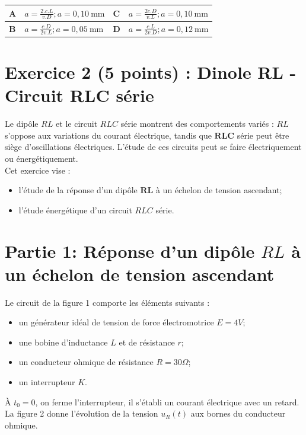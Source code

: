\begin{center}
\begin{tabular}{|l|l|l|l|}
\hline
$\mathbf{A}$ & $a=\frac{2 . c . L}{v . D} ; a=0,10 \mathrm{~mm}$ & $\mathbf{C}$ & $a=\frac{2 c . D}{v . L} ; a=0,10 \mathrm{~mm}$ \\
\hline
$\mathbf{B}$ & $a=\frac{c . D}{2 v . L} ; a=0,05 \mathrm{~mm}$ & $\mathbf{D}$ & $a=\frac{c . L}{2 v . D} ; a=0,12 \mathrm{~mm}$ \\
\hline
\end{tabular}
\end{center}

\section*{Exercice 2 (5 points) : Dinole RL - Circuit RLC série}
Le dipôle $R L$ et le circuit $R L C$ série montrent des comportements variés : $R L$ s'oppose aux variations du courant électrique, tandis que $\boldsymbol{R} \boldsymbol{L} \boldsymbol{C}$ série peut être siège d'oscillations électriques. L'étude de ces circuits peut se faire électriquement ou énergétiquement.\\
Cet exercice vise :

\begin{itemize}
  \item l'étude de la réponse d'un dipôle $\boldsymbol{R} \boldsymbol{L}$ à un échelon de tension ascendant;
  \item l'étude énergétique d'un circuit $R L C$ série.
\end{itemize}

\section*{Partie 1: Réponse d'un dipôle $R L$ à un échelon de tension ascendant}
Le circuit de la figure 1 comporte les éléments suivants :

\begin{itemize}
  \item un générateur idéal de tension de force électromotrice $E=4 V$;
  \item une bobine d'inductance $L$ et de résistance $r$;
  \item un conducteur ohmique de résistance $R=30 \Omega$;
  \item un interrupteur $K$.
\end{itemize}

À $t_{0}=0$, on ferme l'interrupteur, il s'établi un courant électrique avec un retard. La figure 2 donne l'évolution de la tension $u_{R}(t)$ aux bornes du conducteur ohmique.


